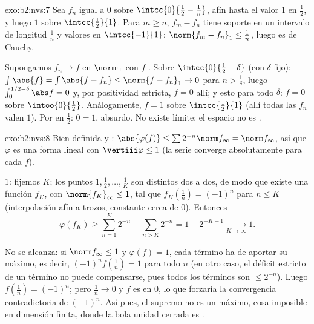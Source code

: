 \begin{solution}{exo:b2:nvs:7}
Sea $f_n$ igual a $0$ sobre $\intcc{0}{\frac12 - \frac1n}$, afín
hasta el valor $1$ en $\frac12$, y luego $1$ sobre
$\intcc{\frac12}{1}$. Para $m \geq n$, $f_m - f_n$ tiene soporte en
un intervalo de longitud $\frac1n$ y valores en $\intcc{-1}{1}$:
$\norm{f_m - f_n}_1 \leq \frac1n$, luego es de Cauchy.

Supongamos $f_n \to f$ en $\norm\cdot_1$ con $f$ . Sobre
$\intcc{0}{\frac12 - \delta}$ (con $\delta$ fijo): $\int \abs{f} =
\int\abs{f - f_n} \leq \norm{f - f_n}_1 \to 0$ para $n >
\frac1\delta$, luego $\int_0^{1/2 - \delta}\abs f = 0$ y, por
positividad estricta, $f = 0$ allí; y esto para todo $\delta$: $f =
0$ sobre $\intoo{0}{\frac12}$. Análogamente, $f = 1$ sobre
$\intcc{\frac12}{1}$ (allí todas las $f_n$ valen $1$). Por
 en $\frac12$: $0 = 1$, absurdo. No existe límite: el
espacio no es .
\end{solution}

\begin{solution}{exo:b2:nvs:8}
Bien definida y : $\abs{\varphi(f)} \leq \sum 2^{-n} \norm
f_\infty = \norm f_\infty$, así que $\varphi$ es una forma lineal
con $\vertiii\varphi \leq 1$ (la serie converge absolutamente para
cada $f$).

 $1$: fijemos $K$; los puntos $1, \frac12, \dots, \frac1K$
son distintos dos a dos, de modo que existe una función 
$f_K$, con $\norm{f_K}_\infty \leq 1$, tal que $f_K(\frac1n) =
(-1)^n$ para $n \leq K$ (interpolación afín a trozos, constante
cerca de $0$). Entonces
\[
\varphi(f_K) \geq \sum_{n=1}^{K} 2^{-n} - \sum_{n > K} 2^{-n}
= 1 - 2^{-K+1} \xrightarrow[K \to \infty]{} 1 .
\]

No se alcanza: si $\norm f_\infty \leq 1$ y $\varphi(f) = 1$, cada
término ha de aportar su máximo, es decir, $(-1)^n f(\frac1n) = 1$
para todo $n$ (en otro caso, el déficit estricto de un término no
puede compensarse, pues todos los términos son $\leq 2^{-n}$). Luego
$f(\frac1n) = (-1)^n$; pero $\frac1n \to 0$ y $f$ es  en
$0$, lo que forzaría la convergencia contradictoria de $(-1)^n$. Así
pues, el supremo no es un máximo, cosa imposible en dimensión
finita, donde la bola unidad cerrada es .
\end{solution}

